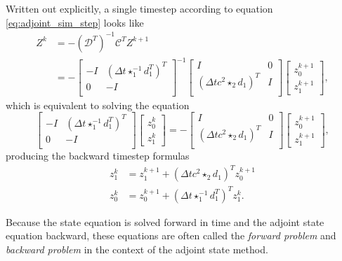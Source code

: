 \documentclass[utf8,english]{gradu3}
\begin{document}
Written out explicitly, a single timestep
according to equation \eqref{eq:adjoint_sim_step} looks like
\begin{align*}
  Z^k &= -(\mathcal{D}^T)^{-1} \mathcal{C}^T Z^{k+1} \\
  &= -\begin{bmatrix}
    -I & (\Delta t \star_1^{-1} d_1^T)^T \\
    0 & -I \\
  \end{bmatrix}^{-1}
  \begin{bmatrix}
    I & 0 \\
    (\Delta t c^2 \star_2 d_1)^T & I \\
  \end{bmatrix}
  \begin{bmatrix}
    z_0^{k+1} \\ z_1^{k+1}
  \end{bmatrix},
\end{align*}
which is equivalent to solving the equation
\[
  \begin{bmatrix}
    -I & (\Delta t \star_1^{-1} d_1^T)^T \\
    0 & -I \\
  \end{bmatrix}
  \begin{bmatrix}
    z_0^k \\ z_1^k
  \end{bmatrix}
  = -\begin{bmatrix}
    I & 0 \\
    (\Delta t c^2 \star_2 d_1)^T & I \\
  \end{bmatrix}
  \begin{bmatrix}
    z_0^{k+1} \\ z_1^{k+1}
  \end{bmatrix},
\]
producing the backward timestep formulas
\begin{align}
z_1^k &= z_1^{k+1} + (\Delta t c^2 \star_2 d_1)^T z_0^{k+1} \\
z_0^k &= z_0^{k+1} + (\Delta t \star_1^{-1} d_1^T)^T z_1^k.
\end{align}

Because the state equation is solved forward in time
and the adjoint state equation backward,
these equations are often called
the \textit{forward problem} and \textit{backward problem}
in the context of the adjoint state method.
\end{document}
